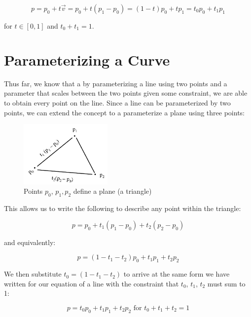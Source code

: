 \documentclass[12pt,letterpaper]{article}
\begin{document}
\begin{equation}
    p = p_{0} + t\overrightarrow{v} = p_{0} + t(p_{1} - p_{0}) = (1 - t)p_{0} + tp_{1} = t_{0}p_{0} + t_{1}p_{1}
\end{equation}

for $t \in [0, 1]$ and $t_{0} + t_{1} = 1$.

\section{Parameterizing a Curve}

Thus far, we know that a by parameterizing a line using two points and a parameter that scales between the two points given some constraint, we are able to obtain every point on the line. Since a line can be parameterized by two points, we can extend the concept to a parameterize a plane using three points:

\begin{figure}[!h]
    \begin{center}
        \includegraphics[width=0.40\textwidth]{figures/01_triangle_param_t}
    \end{center}
    \caption{Points $p_{0}$, $p_{1}, p_{2}$ define a plane (a triangle) }
\end{figure}

This allows us to write the following to describe any point within the triangle:

\begin{equation}
    p = p_{0} + t_{1}(p_{1} - p_{0}) + t_{2}(p_{2} - p_{0})
\end{equation}

and equivalently:

\begin{equation}
    p = (1 - t_{1} - t_{2})p_{0} + t_{1}p_{1} + t_{2}p_{2}
\end{equation}

We  then substitute $t_0 = (1 - t_{1} - t_{2})$ to arrive at the same form we have written for our equation of a line with the constraint that $t_{0}$, $t_{1}$, $t_{2}$ must sum to 1:

\begin{equation}
    p = t_{0}p_{0} + t_{1}p_{1} + t_{2}p_{2} \text{ for } t_{0} + t_{1} + t_{2} = 1
\end{equation}
\end{document}
